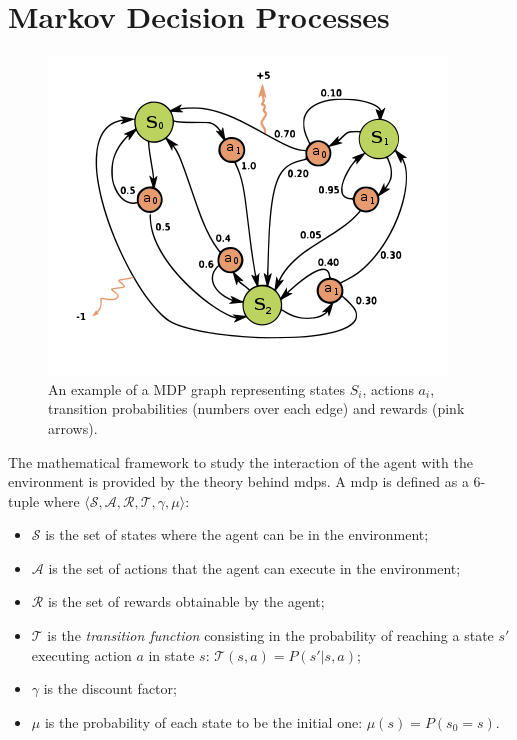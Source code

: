 \section{Markov Decision Processes}
\begin{figure}[t]
\begin{minipage}{\textwidth}
\begin{center}
  \includegraphics[scale=.6]{img/mdp2.png}
\end{center}
\end{minipage}
\caption[Markov Decision Process]{An example of a MDP graph representing states $S_i$, actions $a_i$, transition probabilities (numbers over each edge) and rewards (pink arrows).}\label{F:mdp2}
\end{figure}
The mathematical framework to study the interaction of the agent with the environment is provided by the theory behind \glspl{mdp}. A \gls{mdp} is defined as a $6$-tuple where $\langle \mathcal{S}, \mathcal{A}, \mathcal{R}, \mathcal{T}, \gamma, \mu \rangle$:
\begin{itemize}
 \item $\mathcal{S}$ is the set of states where the agent can be in the environment;
 \item $\mathcal{A}$ is the set of actions that the agent can execute in the environment;
 \item $\mathcal{R}$ is the set of rewards obtainable by the agent;
 \item $\mathcal{T}$ is the \textit{transition function} consisting in the probability of reaching a state $s'$ executing action $a$ in state $s$: $\mathcal{T}(s, a) = P(s' | s, a)$;
 \item $\gamma$ is the discount factor;
 \item $\mu$ is the probability of each state to be the initial one: $\mu(s) = P(s_0 = s)$.
\end{itemize}
